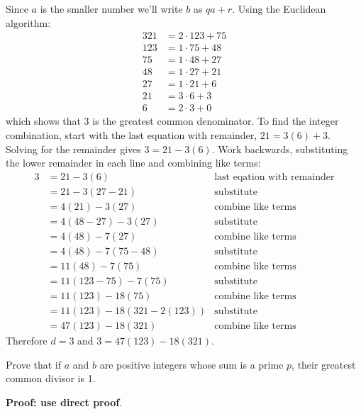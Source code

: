 \documentclass{article}
\begin{document}
Since $a$ is the smaller number we'll write $b$ as $qa + r$. Using the Euclidean algorithm:
\begin{align*}
    321 & = 2 \cdot 123 + 75 \\
    123 & = 1 \cdot 75 + 48  \\
    75  & = 1 \cdot 48 + 27  \\
    48  & = 1 \cdot 27 + 21  \\
    27  & = 1 \cdot 21 + 6   \\
    21  & = 3 \cdot 6 + 3    \\
    6   & = 2 \cdot 3 + 0
\end{align*}
which shows that 3 is the greatest common denominator. To find the integer combination, start with the last equation with remainder, $21 = 3(6) + 3$. Solving for the remainder gives $3 = 21 - 3(6)$. Work backwards, substituting the lower remainder in each line and combining like terms:
\begin{align*}
    3 & = 21 - 3(6)                  & \text{last eqation with remainder} \\
      & = 21 - 3(27 - 21)            & \text{substitute}                  \\
      & = 4(21) - 3(27)              & \text{combine like terms}          \\
      & = 4(48 - 27) - 3(27)         & \text{substitute}                  \\
      & = 4(48) - 7(27)              & \text{combine like terms}          \\
      & = 4(48) - 7(75 - 48)         & \text{substitute}                  \\
      & = 11(48) - 7(75)             & \text{combine like terms}          \\
      & = 11(123 - 75) - 7(75)       & \text{substitute}                  \\
      & = 11(123) - 18(75)           & \text{combine like terms}          \\
      & = 11(123) - 18(321 - 2(123)) & \text{substitute}                  \\
      & = 47(123) - 18(321)          & \text{combine like terms}
\end{align*}
Therefore $d = 3$ and $3 = 47(123) - 18(321)$.

\begin{problem}
Prove that if $a$ and $b$ are positive integers whose sum is a prime $p$, their greatest common divisor is 1.
\end{problem}
\textbf{Proof: use direct proof}.
\\
\end{document}
